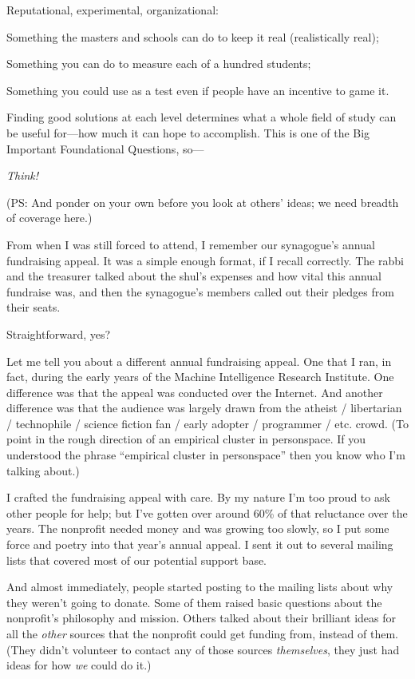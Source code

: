 {
 Reputational, experimental, organizational:}

{
 Something the masters and schools can do to keep it real
(realistically real);}

{
 Something you can do to measure each of a hundred students;}

{
 Something you could use as a test even if people have an incentive
to game it.}

{
 Finding good solutions at each level determines what a whole field
of study can be useful for---how much it can hope to accomplish. This
is one of the Big Important Foundational Questions, so---}

{
 \textit{Think!}}

{
 (PS: And ponder on your own before you look at
others' ideas; we need breadth of coverage here.)}

\myendsectiontext


{
 From when I was still forced to attend, I remember our
synagogue's annual fundraising appeal. It was a simple
enough format, if I recall correctly. The rabbi and the treasurer
talked about the shul's expenses and how vital this
annual fundraise was, and then the synagogue's members
called out their pledges from their seats. }

{
 Straightforward, yes?}

{
 Let me tell you about a different annual fundraising appeal. One
that I ran, in fact, during the early years of the Machine Intelligence
Research Institute. One difference was that the appeal was conducted
over the Internet. And another difference was that the audience was
largely drawn from the atheist / libertarian / technophile / science
fiction fan / early adopter / programmer / etc. crowd. (To point in the
rough direction of an empirical cluster in personspace. If you
understood the phrase ``empirical cluster in
personspace'' then you know who I'm
talking about.)}

{
 I crafted the fundraising appeal with care. By my nature
I'm too proud to ask other people for help; but
I've gotten over around 60\% of that reluctance over
the years. The nonprofit needed money and was growing too slowly, so I
put some force and poetry into that year's annual
appeal. I sent it out to several mailing lists that covered most of our
potential support base.}

{
 And almost immediately, people started posting to the mailing
lists about why they weren't going to donate. Some of
them raised basic questions about the nonprofit's
philosophy and mission. Others talked about their brilliant ideas for
all the \textit{other} sources that the nonprofit could get funding
from, instead of them. (They didn't volunteer to
contact any of those sources \textit{themselves}, they just had ideas
for how \textit{we} could do it.)}

